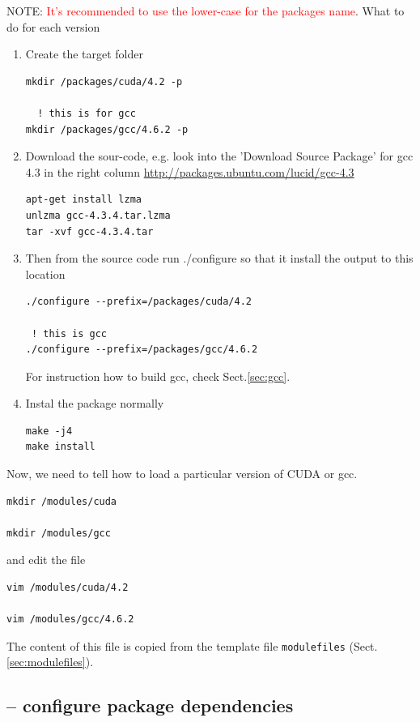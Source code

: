 NOTE: \textcolor{red}{It's recommended to use the lower-case for the packages
name}. What to do for each version
\begin{enumerate}
  \item Create the target folder
\begin{verbatim}
mkdir /packages/cuda/4.2 -p

  ! this is for gcc
mkdir /packages/gcc/4.6.2 -p
\end{verbatim}
 \item Download the sour-code, e.g. look into the 'Download Source Package' for
 gcc 4.3 in the right column
 \url{http://packages.ubuntu.com/lucid/gcc-4.3}
\begin{verbatim}
apt-get install lzma
unlzma gcc-4.3.4.tar.lzma
tar -xvf gcc-4.3.4.tar

\end{verbatim}


  \item Then from the source code run ./configure so that it install the output
  to this location
\begin{verbatim}
./configure --prefix=/packages/cuda/4.2

 ! this is gcc
./configure --prefix=/packages/gcc/4.6.2
\end{verbatim}
For instruction how to build gcc, check Sect.\ref{sec:gcc}.

  \item Instal the package normally
\begin{verbatim}
make -j4
make install
\end{verbatim}
\end{enumerate}

Now, we need to tell how to load a particular version of CUDA or gcc. 
\begin{verbatim}
mkdir /modules/cuda

mkdir /modules/gcc
\end{verbatim}
and edit the file
\begin{verbatim}
vim /modules/cuda/4.2

vim /modules/gcc/4.6.2
\end{verbatim}
The content of this file is copied from the template file \verb!modulefiles!
(Sect.\ref{sec:modulefiles}).

\subsection{-- configure package dependencies}
\label{sec:Modules-prereq}

